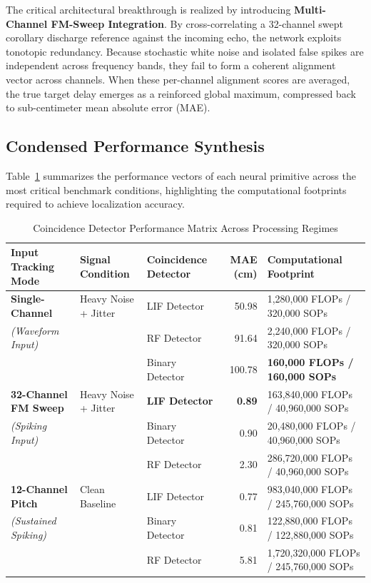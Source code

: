 The critical architectural breakthrough is realized by introducing \textbf{Multi-Channel FM-Sweep Integration}. By cross-correlating a 32-channel swept corollary discharge reference against the incoming echo, the network exploits tonotopic redundancy. Because stochastic white noise and isolated false spikes are independent across frequency bands, they fail to form a coherent alignment vector across channels. When these per-channel alignment scores are averaged, the true target delay emerges as a reinforced global maximum, compressed back to sub-centimeter mean absolute error (MAE).

\subsection{Condensed Performance Synthesis}

Table~\ref{tab:coincidence_benchmark} summarizes the performance vectors of each neural primitive across the most critical benchmark conditions, highlighting the computational footprints required to achieve localization accuracy.

\begin{table}[htbp]
\centering
\small
\caption{Coincidence Detector Performance Matrix Across Processing Regimes}
\label{tab:coincidence_benchmark}
\begin{tabular}{p{2.8cm} p{2.8cm} p{2.2cm} r p{3.8cm}}
\hline
\textbf{Input Tracking Mode} & \textbf{Signal Condition} & \textbf{Coincidence Detector} & \textbf{MAE (cm)} & \textbf{Computational Footprint} \\ \hline
\textbf{Single-Channel} & Heavy Noise + Jitter & LIF Detector & 50.98 & 1,280,000 FLOPs / 320,000 SOPs \\
\textit{(Waveform Input)} & & RF Detector & 91.64 & 2,240,000 FLOPs / 320,000 SOPs \\
 & & Binary Detector & 100.78 & \textbf{160,000 FLOPs / 160,000 SOPs} \\ \hline
\textbf{32-Channel FM Sweep} & Heavy Noise + Jitter & \textbf{LIF Detector} & \textbf{0.89} & 163,840,000 FLOPs / 40,960,000 SOPs \\
\textit{(Spiking Input)} & & Binary Detector & 0.90 & 20,480,000 FLOPs / 40,960,000 SOPs \\
 & & RF Detector & 2.30 & 286,720,000 FLOPs / 40,960,000 SOPs \\ \hline
\textbf{12-Channel Pitch} & Clean Baseline & LIF Detector & 0.77 & 983,040,000 FLOPs / 245,760,000 SOPs \\
\textit{(Sustained Spiking)} & & Binary Detector & 0.81 & 122,880,000 FLOPs / 122,880,000 SOPs \\
 & & RF Detector & 5.81 & 1,720,320,000 FLOPs / 245,760,000 SOPs \\ \hline
\end{tabular}
\end{table}

